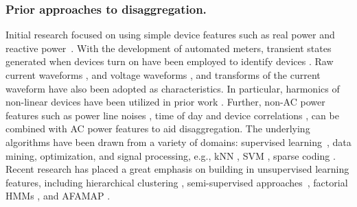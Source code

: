 \subsubsection*{Prior approaches to disaggregation.}
Initial research focused on using
simple device features such as real power
and reactive power~\cite{hart1992}.
With the development of automated meters,
transient states generated when devices turn on have been
employed to
identify devices \cite{shaw2000PhdThesis}.
Raw current waveforms \cite{srinivasan2006neural},
and voltage waveforms \cite{lam2007novel},
and transforms of the current waveform \cite{chan2000harmonics}
have also been adopted as characteristics. In particular,
harmonics of non-linear devices
have been utilized in prior work \cite{chan2000harmonics}.
Further, non-AC power features such as power line noises \cite{patel2007flick},
time of day and device correlations \cite{kim2011unsupervised},
can be combined with AC power features to aid disaggregation.
The underlying algorithms have been drawn from a variety of domains:
supervised learning~\cite{nakano2007non},
data mining, optimization, and signal processing, e.g.,
kNN \cite{shaw2000PhdThesis},
SVM \cite{patel2007flick},
sparse coding \cite{kolter2010sparse}. Recent research has placed a great
emphasis on
building in unsupervised learning features, including
hierarchical clustering \cite{lam2007novel},
semi-supervised approaches~\cite{parson2012nonintrusive},
factorial HMMs \cite{kim2011unsupervised}, and
AFAMAP \cite{kolter2012aistat}.



